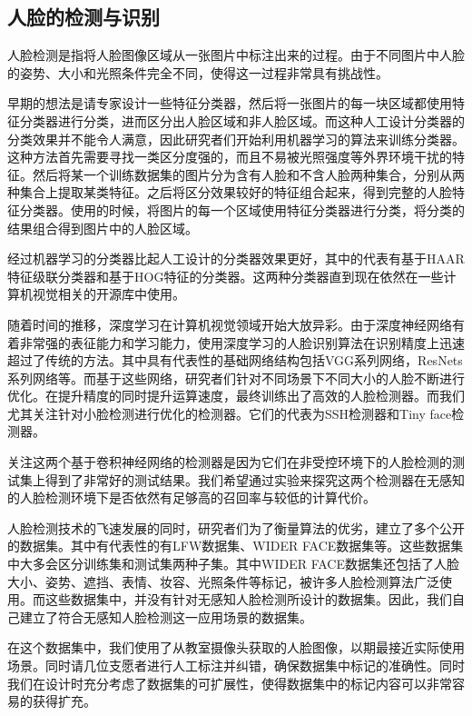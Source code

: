\subsection{人脸的检测与识别}

人脸检测是指将人脸图像区域从一张图片中标注出来的过程。由于不同图片中人脸的姿势、大小和光照条件完全不同，使得这一过程非常具有挑战性。

早期的想法是请专家设计一些特征分类器，然后将一张图片的每一块区域都使用特征分类器进行分类，进而区分出人脸区域和非人脸区域。而这种人工设计分类器的分类效果并不能令人满意，因此研究者们开始利用机器学习的算法来训练分类器。这种方法首先需要寻找一类区分度强的，而且不易被光照强度等外界环境干扰的特征。然后将某一个训练数据集的图片分为含有人脸和不含人脸两种集合，分别从两种集合上提取某类特征。之后将区分效果较好的特征组合起来，得到完整的人脸特征分类器。使用的时候，将图片的每一个区域使用特征分类器进行分类，将分类的结果组合得到图片中的人脸区域。

经过机器学习的分类器比起人工设计的分类器效果更好，其中的代表有基于HAAR特征级联分类器\cite{viola2004robust}和基于HOG特征的分类器\cite{dalal2005histograms}。这两种分类器直到现在依然在一些计算机视觉相关的开源库中使用。

随着时间的推移，深度学习在计算机视觉领域开始大放异彩。由于深度神经网络有着非常强的表征能力和学习能力，使用深度学习的人脸识别算法在识别精度上迅速超过了传统的方法。其中具有代表性的基础网络结构包括VGG系列网络\cite{simonyan2014very}，ResNets系列网络\cite{he2016deep}等。而基于这些网络，研究者们针对不同场景下不同大小的人脸不断进行优化。在提升精度的同时提升运算速度，最终训练出了高效的人脸检测器。而我们尤其关注针对小脸检测进行优化的检测器。它们的代表为SSH检测器\cite{najibi2017ssh}和Tiny face检测器\cite{hu2017finding}。

关注这两个基于卷积神经网络的检测器是因为它们在非受控环境下的人脸检测的测试集上得到了非常好的测试结果。我们希望通过实验来探究这两个检测器在无感知的人脸检测环境下是否依然有足够高的召回率与较低的计算代价。

人脸检测技术的飞速发展的同时，研究者们为了衡量算法的优劣，建立了多个公开的数据集。其中有代表性的有LFW数据集\cite{huang2007labeled}、WIDER FACE数据集\cite{yang2016wider}等。这些数据集中大多会区分训练集和测试集两种子集。其中WIDER FACE数据集还包括了人脸大小、姿势、遮挡、表情、妆容、光照条件等标记，被许多人脸检测算法广泛使用。而这些数据集中，并没有针对无感知人脸检测所设计的数据集。因此，我们自己建立了符合无感知人脸检测这一应用场景的数据集。

在这个数据集中，我们使用了从教室摄像头获取的人脸图像，以期最接近实际使用场景。同时请几位支愿者进行人工标注并纠错，确保数据集中标记的准确性。同时我们在设计时充分考虑了数据集的可扩展性，使得数据集中的标记内容可以非常容易的获得扩充。


